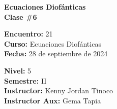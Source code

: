 \begin{center} \textbf
{
    \Large Ecuaciones Diofánticas \\ \vspace{2mm}Clase \#6
}
\end{center}

\begin{multicols}{2}
{
    \textbf{Encuentro:} 21\\
    \textbf{Curso:} Ecuaciones Diofánticas\\
    \textbf{Fecha:} 28 de septiembre de 2024\\
    \begin{flushright}
        \textbf{Nivel:} 5\\
        \textbf{Semestre:} II\\
        \textbf{Instructor:} Kenny Jordan Tinoco\\
        \textbf{Instructor Aux:} Gema Tapia
    \end{flushright}
}
\end{multicols}

\thispagestyle{first-page-style}
